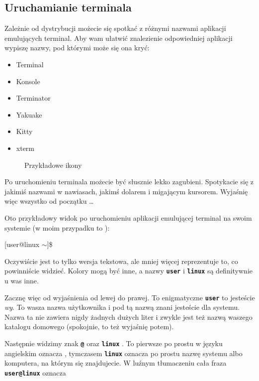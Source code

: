 \documentclass[12pt]{article}
\makeatletter
\newcommand{\ttbf}[1]{
    \texttt{\textbf{#1}}
}
\newenvironment{console1}
{
    \ttfamily
    \fontseries{b}
    \selectfont
    {[}user@linux $\sim${]}\$} {

    }
\makeatother
\begin{document}
\subsection{Uruchamianie terminala}

Zależnie od dystrybucji możecie się spotkać z różnymi nazwami aplikacji emulujących terminal. Aby wam ułatwić znalezienie odpowiedniej aplikacji wypiszę nazwy, pod którymi może się ona kryć:

\begin{itemize}
    \item Terminal
    \item Konsole
    \item Terminator
    \item Yakuake
    \item Kitty
    \item xterm
\end{itemize}

\begin{figure}[H]
    \centering
    \quad
    \subfloat['Konsole']{}
    \caption{Przykładowe ikony}
\end{figure}

Po uruchomieniu terminala możecie być słusznie lekko zagubieni. Spotykacie się z jakimiś nazwami w nawiasach, jakimś dolarem i migającym kursorem. Wyjaśnię więc wszystko od początku \dots

Oto przykładowy widok po uruchomieniu aplikacji emulującej terminal na swoim systemie (w moim przypadku to ):

\begin{console1}

\end{console1}

Oczywiście jest to tylko wersja tekstowa, ale mniej więcej reprezentuje to, co powinniście widzieć. Kolory mogą być inne, a nazwy \ttbf{user} i \ttbf{linux} są definitywnie u was inne.

Zacznę więc od wyjaśnienia od lewej do prawej. To enigmatyczne \ttbf{user} to jesteście \emph{wy}. To wasza nazwa użytkownika i pod tą nazwą znani jesteście dla systemu. Nazwa ta nie zawiera nigdy żadnych dużych liter i zwykle jest też nazwą waszego katalogu domowego (spokojnie, to też wyjaśnię potem).

Następnie widzimy znak \ttbf{@} oraz \ttbf{linux}. To pierwsze po prostu w języku angielskim  oznacza , tymczasem \ttbf{linux} oznacza po prostu nazwę systemu albo komputera, na którym się znajdujecie. W luźnym tłumaczeniu cała fraza \ttbf{user@linux} oznacza 
\end{document}
